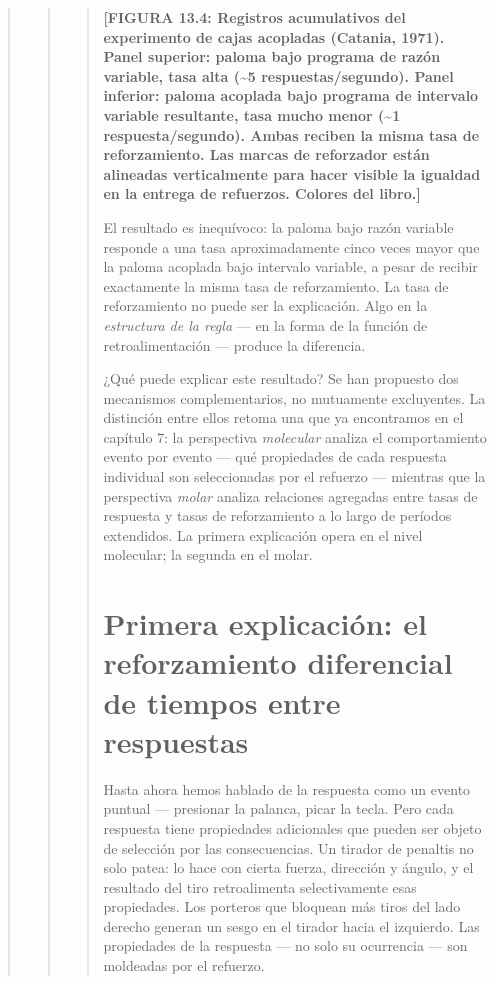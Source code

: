 \documentclass[
  letterpaper,
  DIV=11,
  numbers=noendperiod]{scrreprt}
\begin{document}
\begin{tcolorbox}[enhanced jigsaw, arc=.35mm, bottomrule=.15mm, breakable, colback=white, colframe=quarto-callout-note-color-frame, left=2mm, leftrule=.75mm, opacityback=0, rightrule=.15mm, toprule=.15mm]
\begin{quote}
\begin{quote}
\begin{quote}
\textbf{{[}FIGURA 13.4: Registros acumulativos del experimento de cajas
acopladas (Catania, 1971). Panel superior: paloma bajo programa de razón
variable, tasa alta (\textasciitilde5 respuestas/segundo). Panel
inferior: paloma acoplada bajo programa de intervalo variable
resultante, tasa mucho menor (\textasciitilde1 respuesta/segundo). Ambas
reciben la misma tasa de reforzamiento. Las marcas de reforzador están
alineadas verticalmente para hacer visible la igualdad en la entrega de
refuerzos. Colores del libro.{]}}

El resultado es inequívoco: la paloma bajo razón variable responde a una
tasa aproximadamente cinco veces mayor que la paloma acoplada bajo
intervalo variable, a pesar de recibir exactamente la misma tasa de
reforzamiento. La tasa de reforzamiento no puede ser la explicación.
Algo en la \emph{estructura de la regla} --- en la forma de la función
de retroalimentación --- produce la diferencia.

¿Qué puede explicar este resultado? Se han propuesto dos mecanismos
complementarios, no mutuamente excluyentes. La distinción entre ellos
retoma una que ya encontramos en el capítulo 7: la perspectiva
\emph{molecular} analiza el comportamiento evento por evento --- qué
propiedades de cada respuesta individual son seleccionadas por el
refuerzo --- mientras que la perspectiva \emph{molar} analiza relaciones
agregadas entre tasas de respuesta y tasas de reforzamiento a lo largo
de períodos extendidos. La primera explicación opera en el nivel
molecular; la segunda en el molar.

\mbox{}%
\section{Primera explicación: el reforzamiento diferencial de tiempos
entre
respuestas}\label{primera-explicaciuxf3n-el-reforzamiento-diferencial-de-tiempos-entre-respuestas}

Hasta ahora hemos hablado de la respuesta como un evento puntual ---
presionar la palanca, picar la tecla. Pero cada respuesta tiene
propiedades adicionales que pueden ser objeto de selección por las
consecuencias. Un tirador de penaltis no solo patea: lo hace con cierta
fuerza, dirección y ángulo, y el resultado del tiro retroalimenta
selectivamente esas propiedades. Los porteros que bloquean más tiros del
lado derecho generan un sesgo en el tirador hacia el izquierdo. Las
propiedades de la respuesta --- no solo su ocurrencia --- son moldeadas
por el refuerzo.


\end{quote}
\end{quote}
\end{quote}
\end{tcolorbox}
\end{document}
